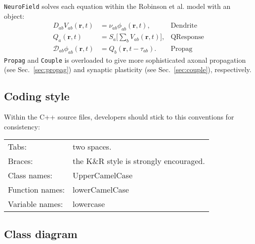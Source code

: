 \documentclass[12pt,a4paper]{article}
\newcommand{\type}[1]{ {\small\small\tt #1} }
\begin{document}
\type{NeuroField} solves each equation within the Robinson et al. model with an object:
\begin{align*}
	D_{ab}V_{ab}(\mathbf{r},t) &= \nu_{ab}\phi_{ab}(\mathbf{r},t), & \mathrm{Dendrite}\\
					  Q_a(\mathbf{r},t) &= S_a \big[\sum_b V_{ab}(\mathbf{r},t) \big], & \mathrm{QResponse}\\
	\mathcal{D}_{ab}\phi_{ab}(\mathbf{r},t) &= Q_b(\mathbf{r},t-\tau_{ab}).&  \mathrm{Propag}
\end{align*}
\type{Propag} and \type{Couple} is overloaded to give more sophisticated axonal propagation (see Sec.~\ref{sec:propag}) and synaptic plasticity (see Sec.~\ref{sec:couple}), respectively.

\subsection{Coding style}

Within the C++ source files, developers should stick to this conventions for consistency:

\begin{tabular}{ l l }
	Tabs:& two spaces.\\
	Braces:& the K\&R style is strongly encouraged.\\
	Class names:&UpperCamelCase\\
	Function names:&lowerCamelCase\\
	Variable names:&lowercase
\end{tabular}

\subsection{Class diagram}
\end{document}
